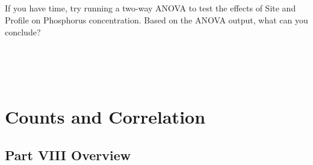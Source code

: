 \documentclass[
]{scrbook}
\begin{document}
\begin{verbatim}





\end{verbatim}

If you have time, try running a two-way ANOVA to test the effects of Site and Profile on Phosphorus concentration.
Based on the ANOVA output, what can you conclude?

\begin{verbatim}




\end{verbatim}

\hypertarget{part-counts-and-correlation}{%
\part{Counts and Correlation}\label{part-counts-and-correlation}}

\hypertarget{Week9}{%
\chapter*{Part VIII Overview}\label{Week9}}
\end{document}

